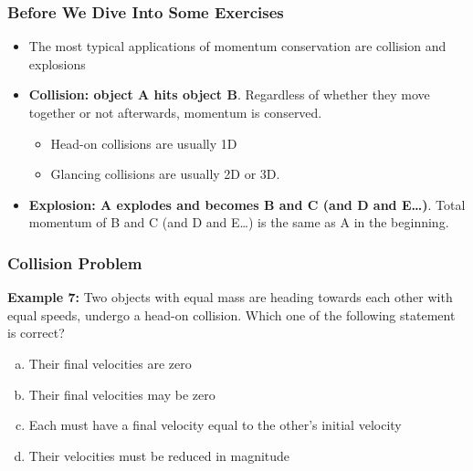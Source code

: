 \documentclass[12pt,compress,aspectratio=169]{beamer}
\begin{document}
%
\begin{frame}
  \frametitle{Before We Dive Into Some Exercises}
  \begin{itemize}
  \item The most typical applications of momentum conservation are collision
    and explosions
  \item\textbf{Collision: object A hits object B}. Regardless of whether they
    move together or not afterwards, momentum is conserved.
    \begin{itemize}
    \item Head-on collisions are usually 1D
    \item Glancing collisions are usually 2D or 3D.
    \end{itemize}
  \item\textbf{Explosion: A explodes and becomes B and C (and D and E\ldots)}.
    Total momentum of B and C (and D and E\ldots) is the same as A in the
    beginning. 
  \end{itemize}
\end{frame}

\begin{frame}
  \frametitle{Collision Problem}
  \textbf{Example 7:} Two objects with equal mass are heading towards each
  other with equal speeds, undergo a head-on collision. Which one of the
  following statement is correct?
  \begin{enumerate}[(a)]
  \item Their final velocities are zero
  \item Their final velocities may be zero
  \item Each must have a final velocity equal to the other's initial velocity
  \item Their velocities must be reduced in magnitude
  \end{enumerate}
\end{frame}
\end{document}
